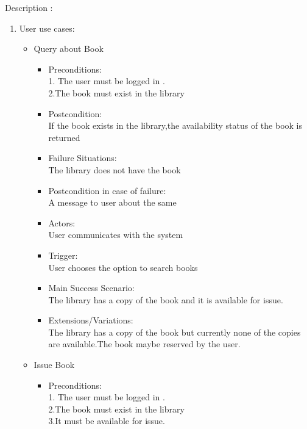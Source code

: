 \documentclass[a4paper]{article}
\begin{document}
Description :
\\
\begin{enumerate}
\item User use cases:
	\begin{itemize}
	
	\item Query about Book\\
	\begin{itemize}
	\item Preconditions:\\
	1. The user must be logged in .\\
	2.The book must exist in the library\\
\item  Postcondition: \\If the book exists in the library,the availability status of the book is returned\\
 \item Failure Situations:\\ The library does not have  the book \\
 \item Postcondition in case of failure:\\A message to user about the same\\
\item  Actors:\\ User communicates with the system\\
\item  Trigger:\\ User chooses the option to search books\\
 \item Main Success Scenario: \\The library has a copy of the book and it is available for issue.\\
\item  Extensions/Variations: \\The library has a copy of the book but currently none of the copies are available.The book maybe reserved by the user.
	\end{itemize}
 \item Issue Book\\
	\begin{itemize}
	 \item Preconditions:\\
	 1. The user must be logged in .\\
	 2.The book must exist in the library \\
	 3.It must be available for issue.\\

\end{itemize}
\end{itemize}
\end{enumerate}
\end{document}
